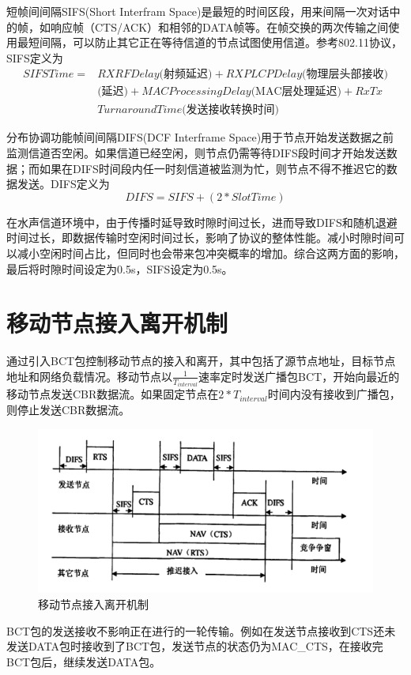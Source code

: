 短帧间间隔SIFS(Short Interfram Space)是最短的时间区段，用来间隔一次对话中的帧，如响应帧（CTS/ACK）和相邻的DATA帧等。在帧交换的两次传输之间使用最短间隔，可以防止其它正在等待信道的节点试图使用信道。参考802.11协议，SIFS定义为
\begin{equation}
\begin{aligned}
SIFSTime=&RXRFDelay\mbox{(射频延迟)}+RXPLCPDelay\mbox{(物理层头部接收)}\\&\mbox{(延迟)}+MACProcessingDelay\mbox{(MAC层处理延迟)}+ RxTx\\&TurnaroundTime\mbox{(发送接收转换时间)}
\end{aligned}
\end{equation}

分布协调功能帧间间隔DIFS(DCF Interframe Space)用于节点开始发送数据之前监测信道否空闲。如果信道已经空闲，则节点仍需等待DIFS段时间才开始发送数据；而如果在DIFS时间段内任一时刻信道被监测为忙，则节点不得不推迟它的数据发送。DIFS定义为
\begin{equation}
DIFS=SIFS+(2*SlotTime)
\end{equation}

在水声信道环境中，由于传播时延导致时隙时间过长，进而导致DIFS和随机退避时间过长，即数据传输时空闲时间过长，影响了协议的整体性能。减小时隙时间可以减小空闲时间占比，但同时也会带来包冲突概率的增加。综合这两方面的影响，最后将时隙时间设定为0.5s，SIFS设定为0.5s。
\section {移动节点接入离开机制}
通过引入BCT包控制移动节点的接入和离开，其中包括了源节点地址，目标节点地址和网络负载情况。移动节点以$\frac{1}{T_{interval}}$速率定时发送广播包BCT，开始向最近的移动节点发送CBR数据流。如果固定节点在$2*T_{interval}$时间内没有接收到广播包，则停止发送CBR数据流。
\begin{figure}[ht]
	\centering
	\includegraphics[scale=0.2]{figures/RC.png}
	\caption{
		移动节点接入离开机制
	}
	\label{fig:example}
\end{figure}
BCT包的发送接收不影响正在进行的一轮传输。例如在发送节点接收到CTS还未发送DATA包时接收到了BCT包，发送节点的状态仍为MAC\_CTS，在接收完BCT包后，继续发送DATA包。

